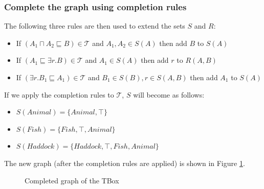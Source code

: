 \subsubsection{Complete the graph using completion rules}
The following three rules are then used to extend the sets $S$ and $R$:
\begin{itemize}
\item If $(A_1 \sqcap A_2 \sqsubseteq B) \in \mathcal{T}$ and $A_1, A_2 \in S(A)$ then add $B$ to $S(A)$
\item If $(A_1 \sqsubseteq \exists r.B) \in \mathcal{T}$ and $A_1 \in S(A)$ then add $r$ to $R(A, B)$
\item If $(\exists r.B_1 \sqsubseteq A_1) \in \mathcal{T}$ and $B_1 \in S(B), r \in S(A, B)$ then add $A_1$ to $S(A)$ 
\end{itemize}
If we apply the completion rules to $\mathcal{T}$, $S$ will become as follows:
\begin{itemize}
\item $S(Animal)= \lbrace Animal, \top \rbrace$
\item $S(Fish)= \lbrace Fish, \top, Animal \rbrace$
\item $S(Haddock) = \lbrace Haddock, \top, Fish, Animal \rbrace$
\end{itemize}
The new graph (after the completion rules are applied) is shown in Figure \ref{hdk-complete}. 

\begin{figure}
\centering
{}
\caption{Completed graph of the TBox}
\label{hdk-complete}
\end{figure}

